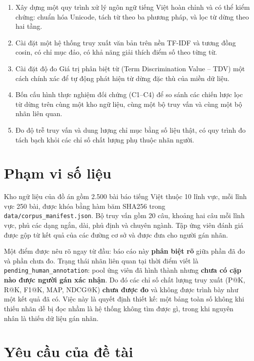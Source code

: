 \begin{enumerate}
  \item Xây dựng một quy trình xử lý ngôn ngữ tiếng Việt hoàn chỉnh và có thể
        kiểm chứng: chuẩn hóa Unicode, tách từ theo ba phương pháp, và lọc từ
        dừng theo hai tầng.
  \item Cài đặt một hệ thống truy xuất văn bản trên nền TF-IDF và tương đồng
        cosin, có chỉ mục đảo, có khả năng giải thích điểm số theo từng từ.
  \item Cài đặt độ đo Giá trị phân biệt từ (Term Discrimination Value -- TDV)
        một cách chính xác để tự động phát hiện từ dừng đặc thù của miền dữ liệu.
  \item Bốn cấu hình thực nghiệm đối chứng (C1--C4) để so sánh các chiến lược
        lọc từ dừng trên cùng một kho ngữ liệu, cùng một bộ truy vấn và cùng một
        bộ nhãn liên quan.
  \item Đo độ trễ truy vấn và dung lượng chỉ mục bằng số liệu thật, có quy trình
        đo tách bạch khỏi các chỉ số chất lượng phụ thuộc nhãn người.
\end{enumerate}

\section{Phạm vi số liệu}

Kho ngữ liệu của đồ án gồm 2.500 bài báo tiếng Việt thuộc 10 lĩnh vực, mỗi lĩnh
vực 250 bài, được khóa bằng hàm băm SHA256 trong
\texttt{data/corpus\_manifest.json}. Bộ truy vấn gồm 20 câu, khoảng hai câu mỗi
lĩnh vực, phủ các dạng ngắn, dài, phủ định và chuyên ngành. Tập ứng viên đánh giá
được gộp từ kết quả của các đường cơ sở và được đưa cho người gán nhãn.

Một điểm được nêu rõ ngay từ đầu: báo cáo này \textbf{phân biệt rõ} giữa phần đã
đo và phần chưa đo. Trạng thái nhãn liên quan tại thời điểm viết là
\texttt{pending\_human\_annotation}: pool ứng viên đã hình thành nhưng \textbf{chưa
có cặp nào được người gán xác nhận}. Do đó các chỉ số chất lượng truy xuất
(P@K, R@K, F1@K, MAP, NDCG@K) \textbf{chưa được đo} và không được trình bày như
một kết quả đã có. Việc này là quyết định thiết kế: một bảng toàn số không khi
thiếu nhãn dễ bị đọc nhầm là hệ thống không tìm được gì, trong khi nguyên nhân là
thiếu dữ liệu gán nhãn.

\section{Yêu cầu của đề tài}

